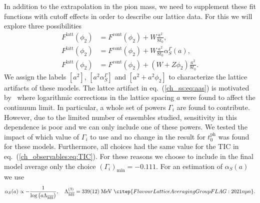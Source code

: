 In addition to the extrapolation in the pion mass, we need to supplement these fit functions with cutoff effects in order to describe our lattice data. For this we will explore three possibilities
\begin{align}
\label{ch_ss:eq:a2}
F^{\textrm{latt}}(\phi_2)&=F^{\textrm{cont}}(\phi_2)+W\frac{a^2}{8t_0},\\
\label{ch_ss:eq:aas}
F^{\textrm{latt}}(\phi_2)&=F^{\textrm{cont}}(\phi_2)+W\frac{a^2}{8t_0}\alpha_S^{\Gamma}(a),\\
\label{ch_ss:eq:a2phi2}
F^{\textrm{latt}}(\phi_2)&=F^{\textrm{cont}}(\phi_2)+\left(W+Z\phi_2\right)\frac{a^2}{8t_0}.
\end{align}
We assign the labels $[a^2]$, $[a^2\alpha_S^{\Gamma}]$ and $[a^2+a^2\phi_2]$ to characterize the lattice artifacts of these models. The lattce artifact in eq.~(\ref{ch_ss:eq:aas}) is motivated by~\citep{Husung:2022kvi} where logarithmic corrections in the lattice spacing $a$ were found to affect the continuum limit. In particular, a whole set of powers $\Gamma_i$ are found to contribute. However, due to the limited number of ensembles studied, sensitivity in this dependence is poor and we can only include one of these powers. We tested the impact of which value of $\Gamma_i$ to use and no change in the result for $t_0^{\textrm{ph}}$ was found for these models. Furthermore, all choices had the same value for the TIC in eq.~(\ref{ch_observables:eq:TIC}). For these reasons we choose to include in the final model average only the choice $\left(\Gamma_i\right)_{\textrm{min}}=-0.111$. For an estimation of $\alpha_S(a)$ we use
\begin{gather}
\alpha_S(a)\propto-\frac{1}{\textrm{log}\left(a\Lambda_{\overline{\textrm{MS}}}\right)}, \quad \Lambda_{\overline{\textrm{MS}}}^{(3)}=339(12)\;\textrm{MeV}~\citep{FlavourLatticeAveragingGroupFLAG:2021npn}.
\end{gather}

